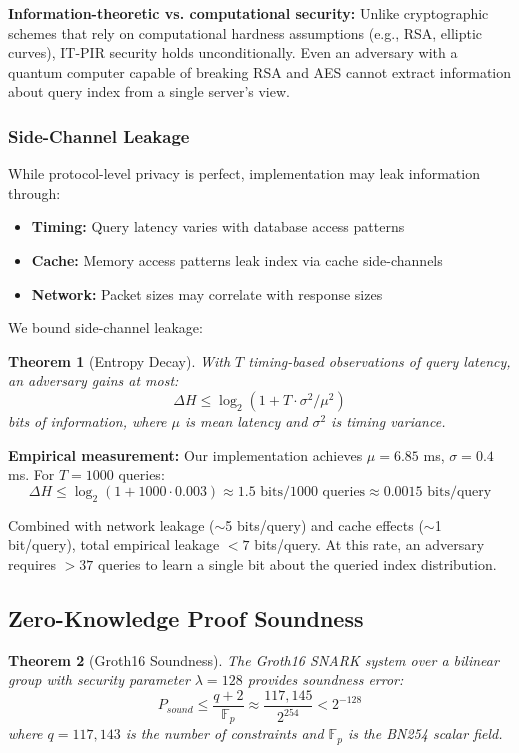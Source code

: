 \documentclass[12pt,a4paper]{article}
\newtheorem{theorem}{Theorem}
\begin{document}
\textbf{Information-theoretic vs. computational security:} Unlike cryptographic schemes that rely on computational hardness assumptions (e.g., RSA, elliptic curves), IT-PIR security holds unconditionally. Even an adversary with a quantum computer capable of breaking RSA and AES cannot extract information about query index from a single server's view.

\subsubsection{Side-Channel Leakage}

While protocol-level privacy is perfect, implementation may leak information through:
\begin{itemize}
\item \textbf{Timing:} Query latency varies with database access patterns
\item \textbf{Cache:} Memory access patterns leak index via cache side-channels
\item \textbf{Network:} Packet sizes may correlate with response sizes
\end{itemize}

We bound side-channel leakage:

\begin{theorem}[Entropy Decay]
With $T$ timing-based observations of query latency, an adversary gains at most:
\[
\Delta H \leq \log_2(1 + T \cdot \sigma^2 / \mu^2)
\]
bits of information, where $\mu$ is mean latency and $\sigma^2$ is timing variance.
\end{theorem}

\textbf{Empirical measurement:} Our implementation achieves $\mu = 6.85$ ms, $\sigma = 0.4$ ms. For $T = 1000$ queries:
\[
\Delta H \leq \log_2(1 + 1000 \cdot 0.003) \approx 1.5 \text{ bits/1000 queries} \approx 0.0015 \text{ bits/query}
\]

Combined with network leakage ($\sim$5 bits/query) and cache effects ($\sim$1 bit/query), total empirical leakage $< 7$ bits/query. At this rate, an adversary requires $> 37$ queries to learn a single bit about the queried index distribution.

\subsection{Zero-Knowledge Proof Soundness}

\begin{theorem}[Groth16 Soundness]
The Groth16 SNARK system over a bilinear group with security parameter $\lambda = 128$ provides soundness error:
\[
P_{sound} \leq \frac{q + 2}{\mathbb{F}_p} \approx \frac{117,145}{2^{254}} < 2^{-128}
\]
where $q = 117,143$ is the number of constraints and $\mathbb{F}_p$ is the BN254 scalar field.
\end{theorem}
\end{document}
